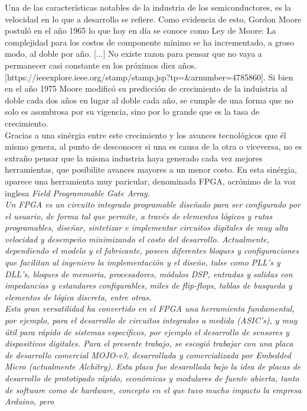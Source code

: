 
	Una de las características notables de la industria de los semiconductores, es la velocidad en lo que a desarrollo se refiere. Como evidencia de esto, Gordon Moore postuló en el año 1965 lo que 
hoy en día se conoce como Ley de Moore: La complejidad para los costos de componente mínimo se ha incrementado, a groso modo, al doble por año. [...] No existe razon para pensar que no vaya a permanecer
casi constante en los próximos diez años.[https://ieeexplore.ieee.org/stamp/stamp.jsp?tp=&arnumber=4785860]. Si bien en el año 1975 Moore modificó su predicción de crecimiento de la induistria al doble
cada dos años en lugar al doble cada año, se cumple de una forma que no solo es asombrosa por su vigencia, sino por lo grande que es la tasa de crecimiento.\\
	Gracias a una sinérgia entre este crecimiento y los avances tecnológicos que él mismo genera, al punto de desconocer si una es causa de la otra o viceversa, no es extraño pensar que la misma 
industria haya generado cada vez mejores herramientas, que posibilite avances mayores a un menor costo. En esta sinérgia, aparece una herramienta muy paricular, denominada FPGA, acrónimo de la voz 
inglesa \it{Field Programmable Gate Array}.\\
	Un FPGA es un circuito integrado programable diseñado para ser configurado por el usuario, de forma tal que permite, a través de elementos lógicos y rutas programables, diseñar, sintetizar e 
implementar circuitos digitales de muy alta velocidad y desempeño minimizando el costo del desarrollo. Actualmente, dependiendo el modelo y el fabricante, poseen diferentes bloques y configuraciones 
que facilitan al ingeniero la implementación y el diseño, talse como PLL's y DLL's, bloques de memoria, procesadores, módulos DSP, entradas y salidas con impedancias y estandares configurables, miles de 
flip-flops, tablas de busqueda y elementos de lógica discreta, entre otras.\\
	Esta gran versatilidad ha convertido en el FPGA una herramienta fundamental, por ejemplo, para el desarrollo de circuitos integrados a medida (ASIC's), y muy útil para rápido de 
sistemas específicos, por ejemplo el desarrollo de sensores y dispositivos digitales.
	Para el presente trabajo, se escogió trabajar con una placa de desarrollo comercial MOJO-v3, desarrollada y comercializada por Embedded Micro (actualmente Alchitry). Esta placa fue desarollada
bajo la idea de placas de desarrollo de prototipado rápido, económicas y modulares de fuente abierta, tanto de software como de hardware, concepto en el que tuvo mucho impacto la empresa Arduino, pero 
